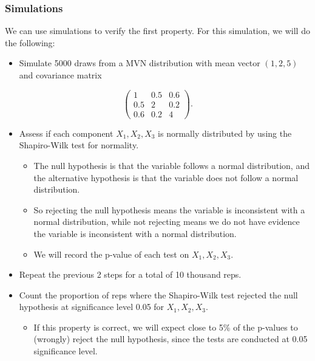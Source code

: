 \documentclass[
]{book}
\providecommand{\tightlist}{%
  \setlength{\itemsep}{0pt}\setlength{\parskip}{0pt}}
\begin{document}
\hypertarget{SW1}{%
\subsubsection{Simulations}\label{SW1}}

We can use simulations to verify the first property. For this simulation, we will do the following:

\begin{itemize}
\tightlist
\item
  Simulate 5000 draws from a MVN distribution with mean vector \((1,2,5)\) and covariance matrix
\end{itemize}

\[
\begin{pmatrix}
1 & 0.5 & 0.6\\
0.5 & 2 & 0.2 \\
0.6 & 0.2 & 4
\end{pmatrix}.
\]

\begin{itemize}
\item
  Assess if each component \(X_1, X_2, X_3\) is normally distributed by using the Shapiro-Wilk test for normality.

  \begin{itemize}
  \tightlist
  \item
    The null hypothesis is that the variable follows a normal distribution, and the alternative hypothesis is that the variable does not follow a normal distribution.
  \item
    So rejecting the null hypothesis means the variable is inconsistent with a normal distribution, while not rejecting means we do not have evidence the variable is inconsistent with a normal distribution.
  \item
    We will record the p-value of each test on \(X_1, X_2, X_3\).
  \end{itemize}
\item
  Repeat the previous 2 steps for a total of 10 thousand reps.
\item
  Count the proportion of reps where the Shapiro-Wilk test rejected the null hypothesis at significance level 0.05 for \(X_1, X_2, X_3\).

  \begin{itemize}
  \tightlist
  \item
    If this property is correct, we will expect close to 5\% of the p-values to (wrongly) reject the null hypothesis, since the tests are conducted at 0.05 significance level.
  \end{itemize}
\end{itemize}
\end{document}
